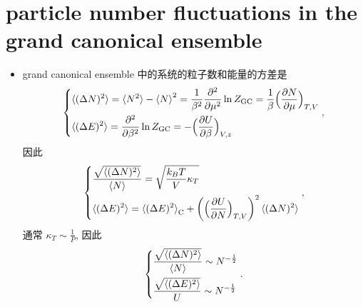 \section{particle number fluctuations in the grand canonical ensemble}
\begin{itemize}
	\item grand canonical ensemble 中的系统的粒子数和能量的方差是
	\begin{equation} \label{4.4.1}
		\begin{dcases}
			\braket{(\Delta N)^2} = \braket{N^2} - \braket{N}^2 = \frac{1}{\beta^2} \frac{\partial^2}{\partial \mu^2} \ln Z_\text{GC} = \frac{1}{\beta} \Big( \frac{\partial N}{\partial \mu} \Big)_{T, V} \\
			\braket{(\Delta E)^2} = \frac{\partial^2}{\partial \beta^2} \ln Z_\text{GC} = - \Big( \frac{\partial U}{\partial \beta} \Big)_{V, z}
		\end{dcases},
	\end{equation}
	因此
	\begin{equation} \label{4.4.2}
		\begin{dcases}
			\frac{\sqrt{\braket{(\Delta N)^2}}}{\braket{N}} = \sqrt{\frac{k_B T}{V} \kappa_T} \\
			\braket{(\Delta E)^2} = \braket{(\Delta E)^2}_\text{C} + \bigg( \Big( \frac{\partial U}{\partial N} \Big)_{T, V} \bigg)^2 \braket{(\Delta N)^2}
		\end{dcases},
	\end{equation}
	通常 $\kappa_T \sim \frac{1}{P}$, 因此
	\begin{equation}
		\begin{dcases}
			\frac{\sqrt{\braket{(\Delta N)^2}}}{\braket{N}} \sim N^{- \frac{1}{2}} \\
			\frac{\sqrt{\braket{(\Delta E)^2}}}{U} \sim N^{- \frac{1}{2}}
		\end{dcases}.
	\end{equation}
	

\end{itemize}
